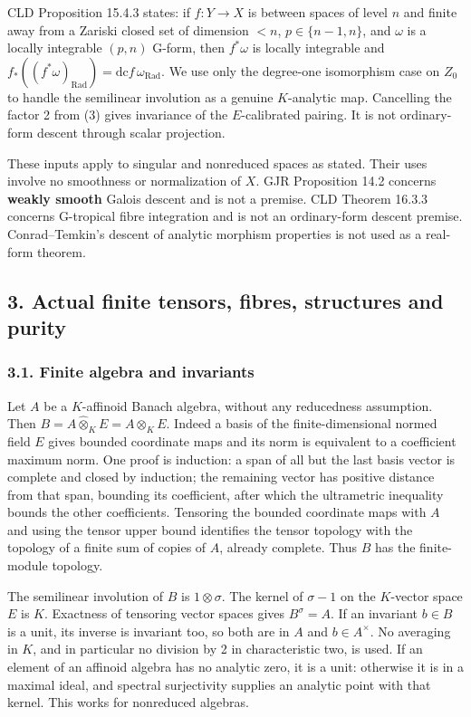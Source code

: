 \documentclass[
  11pt,
]{article}
\begin{document}
\begin{enumerate}
  CLD Proposition 15.4.3 states: if \(f:Y\to X\) is between spaces of
  level \(n\) and finite away from a Zariski closed set of dimension
  \(<n\), \(p\in\{n-1,n\}\), and \(\omega\) is a locally integrable
  \((p,n)\) G-form, then \(f^*\omega\) is locally integrable and
  \(f_*((f^*\omega)_{\mathrm{Rad}})=\mathrm{dc}f\,\omega_{\mathrm{Rad}}\).
  We use only the degree-one isomorphism case on \(Z_0\) to handle the
  semilinear involution as a genuine \(K\)-analytic map. Cancelling the
  factor 2 from (3) gives invariance of the \(E\)-calibrated pairing. It
  is not ordinary-form descent through scalar projection.
\end{enumerate}

These inputs apply to singular and nonreduced spaces as stated. Their
uses involve no smoothness or normalization of \(X\). GJR Proposition
14.2 concerns \textbf{weakly smooth} Galois descent and is not a
premise. CLD Theorem 16.3.3 concerns G-tropical fibre integration and is
not an ordinary-form descent premise. Conrad--Temkin's descent of
analytic morphism properties is not used as a real-form theorem.

\subsection{3. Actual finite tensors, fibres, structures and
purity}\label{actual-finite-tensors-fibres-structures-and-purity}

\subsubsection{3.1. Finite algebra and
invariants}\label{finite-algebra-and-invariants}

Let \(A\) be a \(K\)-affinoid Banach algebra, without any reducedness
assumption. Then \(B=A\widehat\otimes_K E=A\otimes_K E\). Indeed a basis
of the finite-dimensional normed field \(E\) gives bounded coordinate
maps and its norm is equivalent to a coefficient maximum norm. One proof
is induction: a span of all but the last basis vector is complete and
closed by induction; the remaining vector has positive distance from
that span, bounding its coefficient, after which the ultrametric
inequality bounds the other coefficients. Tensoring the bounded
coordinate maps with \(A\) and using the tensor upper bound identifies
the tensor topology with the topology of a finite sum of copies of
\(A\), already complete. Thus \(B\) has the finite-module topology.

The semilinear involution of \(B\) is \(1\otimes\sigma\). The kernel of
\(\sigma-1\) on the \(K\)-vector space \(E\) is \(K\). Exactness of
tensoring vector spaces gives \(B^\sigma=A\). If an invariant \(b\in B\)
is a unit, its inverse is invariant too, so both are in \(A\) and
\(b\in A^\times\). No averaging in \(K\), and in particular no division
by 2 in characteristic two, is used. If an element of an affinoid
algebra has no analytic zero, it is a unit: otherwise it is in a maximal
ideal, and spectral surjectivity supplies an analytic point with that
kernel. This works for nonreduced algebras.
\end{document}
